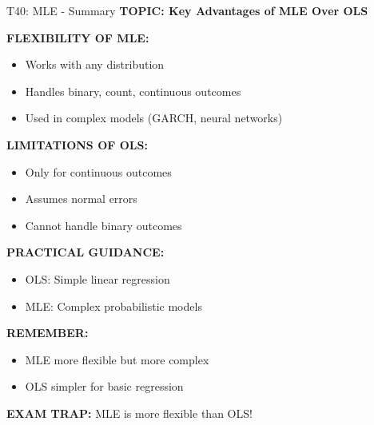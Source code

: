 \documentclass[8pt]{beamer}
\begin{document}
	\begin{frame}{T40: MLE - Summary}
		\fontsize{6.5}{7.5}\selectfont
		\textbf{TOPIC: Key Advantages of MLE Over OLS}
		
		\vspace{0.1cm}
		\textbf{FLEXIBILITY OF MLE:}
		\begin{itemize}
			\item Works with any distribution
			\item Handles binary, count, continuous outcomes
			\item Used in complex models (GARCH, neural networks)
		\end{itemize}
		
		\vspace{0.1cm}
		\textbf{LIMITATIONS OF OLS:}
		\begin{itemize}
			\item Only for continuous outcomes
			\item Assumes normal errors
			\item Cannot handle binary outcomes
		\end{itemize}
		
		\vspace{0.1cm}
		\textbf{PRACTICAL GUIDANCE:}
		\begin{itemize}
			\item \textcolor{myblue}{OLS:} Simple linear regression
			\item \textcolor{myblue}{MLE:} Complex probabilistic models
		\end{itemize}
		
		\vspace{0.1cm}
		\textbf{REMEMBER:}
		\begin{itemize}
			\item MLE more flexible but more complex
			\item OLS simpler for basic regression
		\end{itemize}
		
		\textcolor{myred}{\textbf{EXAM TRAP:}} MLE is \textcolor{myblue}{more flexible} than OLS!
	\end{frame}
	
	
\end{document}
